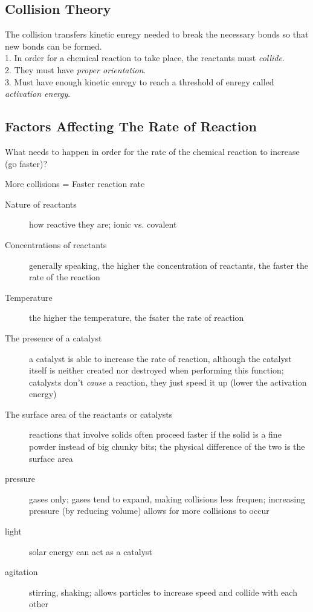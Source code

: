\documentclass[11pt]{article}
\begin{document}
    \subsection{Collision Theory}
    The collision transfers kinetic enregy needed to break the necessary bonds so that new bonds can be formed.\\
    1. In order for a chemical reaction to take place, the reactants must \emph{collide}. \\
    2. They must have \emph{proper orientation}. \\
    3. Must have enough kinetic enregy to reach a threshold of enregy called \emph{activation energy}. \\
    
    \subsection{Factors Affecting The Rate of Reaction}
    What needs to happen in order for the rate of the chemical reaction to increase (go faster)?

    \begin{center}
        More collisions = Faster reaction rate
    \end{center}

    \begin{description}
        \item[Nature of reactants] how reactive they are; ionic vs. covalent
        \item[Concentrations of reactants] generally speaking, the higher the concentration of reactants, the faster the rate of the reaction
        \item[Temperature] the higher the temperature, the fsater the rate of reaction
        \item[The presence of a catalyst] a catalyst is able to increase the rate of reaction, although the catalyst itself is neither created nor destroyed when performing this function; catalysts don't \emph{cause} a reaction, they just speed it up (lower the activation energy)
        \item[The surface area of the reactants or catalysts] reactions that involve solids often proceed faster if the solid is a fine powder instead of big chunky bits; the physical difference of the two is the surface area
        \item[pressure] gases only; gases tend to expand, making collisions less frequen; increasing pressure (by reducing volume) allows for more collisions to occur
        \item[light] solar energy can act as a catalyst
        \item[agitation] stirring, shaking; allows particles to increase speed and collide with each other        
    \end{description}
\end{document}
